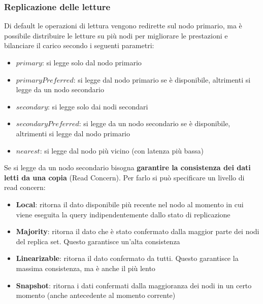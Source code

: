 \documentclass[a4paper,twoside]{article}
\begin{document}
\subsubsection{Replicazione delle letture}
Di default le operazioni di lettura vengono redirette sul nodo primario, ma è
possibile distribuire le letture su più nodi per migliorare le prestazioni e bilanciare
il carico secondo i seguenti parametri:
\begin{itemize}
  \item \( primary \): si legge solo dal nodo primario

  \item \( primaryPreferred \): si legge dal nodo primario se è disponibile, altrimenti
    si legge da un nodo secondario

  \item \( secondary \): si legge solo dai nodi secondari

  \item \( secondaryPreferred \): si legge da un nodo secondario se è disponibile,
    altrimenti si legge dal nodo primario

  \item \( nearest \): si legge dal nodo più vicino (con latenza più bassa)
\end{itemize}
Se si legge da un nodo secondario bisogna \textbf{garantire la consistenza dei dati letti
da una copia} (Read Concern). Per farlo si può specificare un livello di read concern:
\begin{itemize}
  \item \textbf{Local}: ritorna il dato disponibile più recente nel nodo al momento in
    cui viene eseguita la query indipendentemente dallo stato di replicazione

  \item \textbf{Majority}: ritorna il dato che è stato confermato dalla maggior parte
    dei nodi del replica set. Questo garantisce un'alta consistenza

  \item \textbf{Linearizable}: ritorna il dato confermato da tutti. Questo garantisce
    la massima consistenza, ma è anche il più lento

  \item \textbf{Snapshot}: ritorna i dati confermati dalla maggioranza dei nodi in
    un certo momento (anche antecedente al momento corrente)
\end{itemize}
\end{document}
